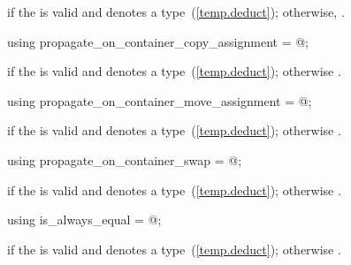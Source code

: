 \begin{itemdescr}
\pnum
\ctype {} if
the   is valid and denotes a
type~(\ref{temp.deduct}); otherwise,
.
\end{itemdescr}

%
\begin{itemdecl}
using propagate_on_container_copy_assignment = @\seebelow@;
\end{itemdecl}

\begin{itemdescr}
\pnum
\ctype {} if
the   is valid and denotes a
type~(\ref{temp.deduct}); otherwise
.
\end{itemdescr}

%
\begin{itemdecl}
using propagate_on_container_move_assignment = @\seebelow@;
\end{itemdecl}

\begin{itemdescr}
\pnum
\ctype {} if
the   is valid and denotes a
type~(\ref{temp.deduct}); otherwise
.
\end{itemdescr}

%
\begin{itemdecl}
using propagate_on_container_swap = @\seebelow@;
\end{itemdecl}

\begin{itemdescr}
\pnum
\ctype {} if
the   is valid and denotes a
type~(\ref{temp.deduct}); otherwise
.
\end{itemdescr}

%
\begin{itemdecl}
using is_always_equal = @\seebelow@;
\end{itemdecl}

\begin{itemdescr}
\pnum
\ctype {} if
the  
is valid and denotes a type~(\ref{temp.deduct});
otherwise .
\end{itemdescr}

